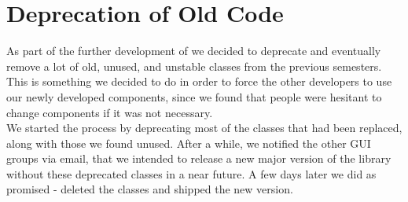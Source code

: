 
\section{Deprecation of Old Code}
\label{sec:deprecation_of_old_code}

As part of the further development of \gc we decided to deprecate and eventually remove a lot of old, unused, and unstable classes from the previous semesters. This is something we decided to do in order to force the other developers to use our newly developed components, since we found that people were hesitant to change components if it was not necessary.\\

We started the process by deprecating most of the classes that had been replaced, along with those we found unused. After a while, we notified the other GUI groups via email, that we intended to release a new major version of the \gc library without these deprecated classes in a near future. A few days later we did as promised - deleted the classes and shipped the new version. 